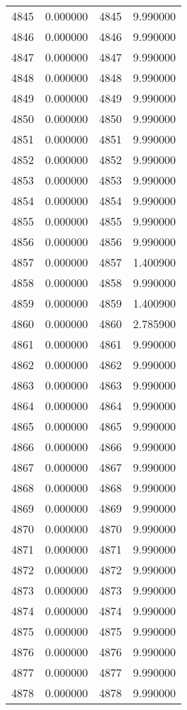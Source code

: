 \documentclass[12pt]{article}
\begin{document}
\begin{longtable}{@{}cccc@{}}
4845 & 0.000000 & 4845 & 9.990000 \\
4846 & 0.000000 & 4846 & 9.990000 \\
4847 & 0.000000 & 4847 & 9.990000 \\
4848 & 0.000000 & 4848 & 9.990000 \\
4849 & 0.000000 & 4849 & 9.990000 \\
4850 & 0.000000 & 4850 & 9.990000 \\
4851 & 0.000000 & 4851 & 9.990000 \\
4852 & 0.000000 & 4852 & 9.990000 \\
4853 & 0.000000 & 4853 & 9.990000 \\
4854 & 0.000000 & 4854 & 9.990000 \\
4855 & 0.000000 & 4855 & 9.990000 \\
4856 & 0.000000 & 4856 & 9.990000 \\
4857 & 0.000000 & 4857 & 1.400900 \\
4858 & 0.000000 & 4858 & 9.990000 \\
4859 & 0.000000 & 4859 & 1.400900 \\
4860 & 0.000000 & 4860 & 2.785900 \\
4861 & 0.000000 & 4861 & 9.990000 \\
4862 & 0.000000 & 4862 & 9.990000 \\
4863 & 0.000000 & 4863 & 9.990000 \\
4864 & 0.000000 & 4864 & 9.990000 \\
4865 & 0.000000 & 4865 & 9.990000 \\
4866 & 0.000000 & 4866 & 9.990000 \\
4867 & 0.000000 & 4867 & 9.990000 \\
4868 & 0.000000 & 4868 & 9.990000 \\
4869 & 0.000000 & 4869 & 9.990000 \\
4870 & 0.000000 & 4870 & 9.990000 \\
4871 & 0.000000 & 4871 & 9.990000 \\
4872 & 0.000000 & 4872 & 9.990000 \\
4873 & 0.000000 & 4873 & 9.990000 \\
4874 & 0.000000 & 4874 & 9.990000 \\
4875 & 0.000000 & 4875 & 9.990000 \\
4876 & 0.000000 & 4876 & 9.990000 \\
4877 & 0.000000 & 4877 & 9.990000 \\
4878 & 0.000000 & 4878 & 9.990000 \\

\end{longtable}
\end{document}
